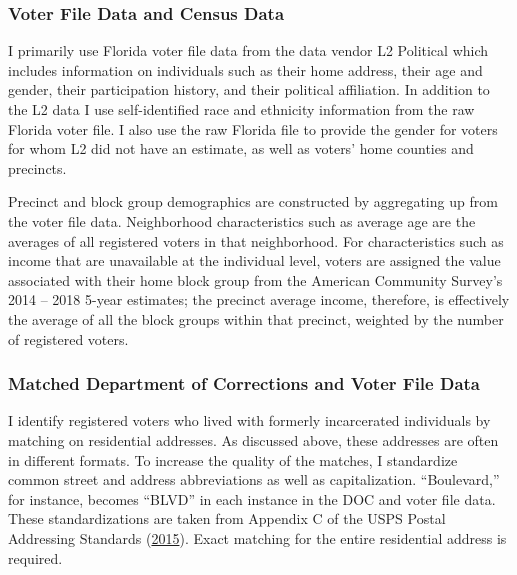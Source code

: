 \documentclass[
  12pt,
]{article}
\begin{document}
\hypertarget{voter-file-data-and-census-data}{%
\subsubsection*{Voter File Data and Census Data}\label{voter-file-data-and-census-data}}

I primarily use Florida voter file data from the data vendor L2 Political which includes information on individuals such as their home address, their age and gender, their participation history, and their political affiliation. In addition to the L2 data I use self-identified race and ethnicity information from the raw Florida voter file. I also use the raw Florida file to provide the gender for voters for whom L2 did not have an estimate, as well as voters' home counties and precincts.

Precinct and block group demographics are constructed by aggregating up from the voter file data. Neighborhood characteristics such as average age are the averages of all registered voters in that neighborhood. For characteristics such as income that are unavailable at the individual level, voters are assigned the value associated with their home block group from the American Community Survey's 2014 -- 2018 5-year estimates; the precinct average income, therefore, is effectively the average of all the block groups within that precinct, weighted by the number of registered voters.

\hypertarget{matched-department-of-corrections-and-voter-file-data}{%
\subsubsection*{Matched Department of Corrections and Voter File Data}\label{matched-department-of-corrections-and-voter-file-data}}

I identify registered voters who lived with formerly incarcerated individuals by matching on residential addresses. As discussed above, these addresses are often in different formats. To increase the quality of the matches, I standardize common street and address abbreviations as well as capitalization. ``Boulevard,'' for instance, becomes ``BLVD'' in each instance in the DOC and voter file data. These standardizations are taken from Appendix C of the USPS Postal Addressing Standards (\protect\hyperlink{ref-USPS2015}{2015}). Exact matching for the entire residential address is required.
\end{document}
